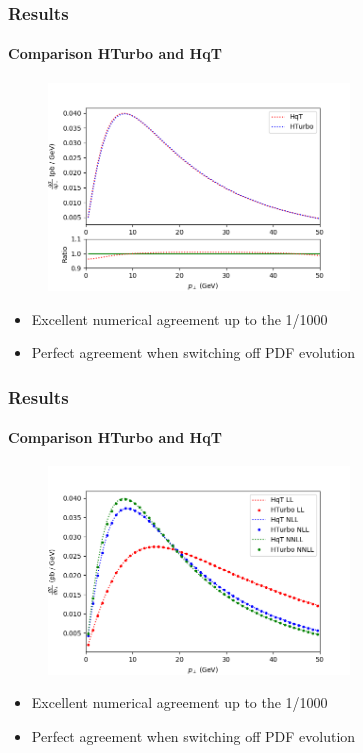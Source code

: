 \documentclass[aspectratio=43]{beamer}
\begin{document}
\begin{frame}

	\frametitle{Results}
	\framesubtitle{Comparison HTurbo and HqT}
	
	\begin{figure}
		\includegraphics[width = 8cm]{plots/hturbo_NNLL_f2only2.png}
	\end{figure}
	
	\begin{itemize}
		\item Excellent numerical agreement up to the 1/1000
		\item Perfect agreement when switching off PDF evolution
	\end{itemize}

\end{frame}

\begin{frame}
	
	\frametitle{Results}
	\framesubtitle{Comparison HTurbo and HqT}
	
	\begin{figure}
		\includegraphics[width = 8cm]{plots/hturbo_all_noevol.png}
	\end{figure}
	
	\begin{itemize}
		\item Excellent numerical agreement up to the 1/1000
		\item Perfect agreement when switching off PDF evolution
	\end{itemize}

\end{frame}
\end{document}
